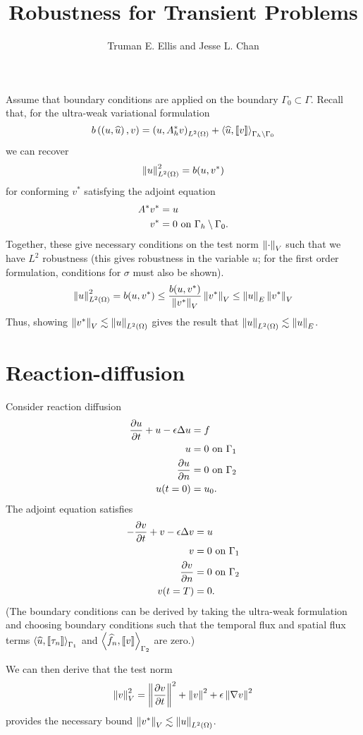 \documentclass{article}
\title{Robustness for Transient Problems}
\author{Truman E. Ellis and Jesse L. Chan}
\begin{document}
\maketitle

Assume that boundary conditions are applied on the boundary $\Gamma_0\subset \Gamma$.  Recall that, for the ultra-weak variational formulation
\[
b\left( \left( u,\widehat{u} \right),v \right) = \left( u,A^*_h v \right)_{L^2\left( \Omega \right)} + \left\langle \widehat{u}, \left[ \![v]\! \right] \right\rangle_{\Gamma_h\setminus \Gamma_0}
\]
we can recover
\[
\left\| u \right\|_{L^2\left( \Omega \right)}^2 = b(u,v^*)
\]
for conforming $v^*$ satisfying the adjoint equation
\begin{align*}
A^* v^* &= u\\
v^* &= 0 \text{ on } \Gamma_h\setminus\Gamma_0.
\end{align*}
Together, these give necessary conditions on the test norm $\left\| \cdot \right\|_V$ such that we have $L^2$ robustness (this gives robustness in the variable $u$; for the first order formulation, conditions for $\sigma$ must also be shown).  
\[
\left\| u \right\|_{L^2\left( \Omega \right)}^2 = b(u,v^*) \leq \frac{b(u,v^*)}{\left\| v^* \right\|_V} \left\| v^* \right\|_V \leq \left\| u \right\|_E \left\| v^* \right\|_V
\]
Thus, showing $\left\| v^* \right\|_V \lesssim \left\| u \right\|_{L^2\left( \Omega \right)}$ gives the result that $\left\| u \right\|_{L^2\left( \Omega \right)} \lesssim \left\| u \right\|_E$.  


\section{Reaction-diffusion}

Consider reaction diffusion
\begin{align*}
\frac{\partial u}{\partial t} + u - \epsilon \Delta u &= f\\
u &= 0 \text{ on } \Gamma_1\\
\frac{\partial u}{\partial n} &= 0 \text{ on } \Gamma_2\\
u(t=0) &= u_0.
\end{align*}
The adjoint equation satisfies
\begin{align*}
-\frac{\partial v}{\partial t} + v - \epsilon \Delta v &= u\\
v &= 0 \text{ on } \Gamma_1\\
\frac{\partial v}{\partial n} &= 0 \text{ on } \Gamma_2\\
v(t=T) &= 0.
\end{align*}
(The boundary conditions can be derived by taking the ultra-weak formulation and choosing boundary conditions such that the temporal flux and spatial flux terms $\left\langle \widehat{u}, \left[ \![\tau_n]\! \right] \right\rangle_{\Gamma_1}$ and $\left\langle \widehat{f}_n,\left[ \![v]\! \right] \right\rangle_{\Gamma_2}$ are zero.)

We can then derive that the test norm
\[
\left\| v \right\|_V^2 = \left\| \frac{\partial v}{\partial t} \right\|^2 + \left\| v \right\|^2 + \epsilon\left\| \nabla v \right\|^2 
\]
provides the necessary bound $\left\| v^* \right\|_V \lesssim \left\| u \right\|_{L^2\left( \Omega \right)}$.
\end{document}
